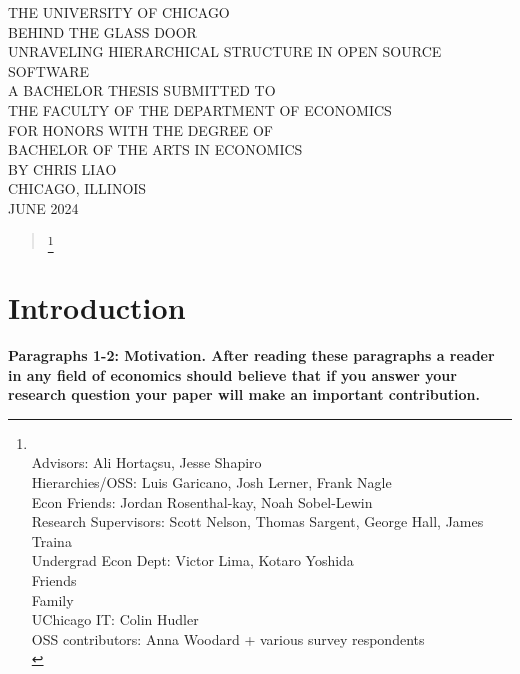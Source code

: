 \documentclass[12pt,notitlepage]{article}
\begin{document}
\begin{titlepage}
\begin{center}
THE UNIVERSITY OF CHICAGO
\\[1.5in]
BEHIND THE GLASS DOOR\\
UNRAVELING HIERARCHICAL STRUCTURE IN OPEN SOURCE SOFTWARE
\\[1in]
A BACHELOR THESIS SUBMITTED TO \\
\bigskip
THE FACULTY OF THE DEPARTMENT OF ECONOMICS \\
\bigskip
FOR HONORS WITH THE DEGREE OF \\
\bigskip
BACHELOR OF THE ARTS IN ECONOMICS
\\[1.5in]
BY CHRIS LIAO
\\[2in]
CHICAGO, ILLINOIS \\
JUNE 2024
\end{center}
\end{titlepage}

\tableofcontents
\newpage

\begin{abstract}
   \footnote{\\
   Advisors: Ali Hortaçsu, Jesse Shapiro\\
   Hierarchies/OSS: Luis Garicano, Josh Lerner, Frank Nagle\\
   Econ Friends: Jordan Rosenthal-kay, Noah Sobel-Lewin\\
   Research Supervisors: Scott Nelson, Thomas Sargent, George Hall, James Traina \\
   Undergrad Econ Dept: Victor Lima, Kotaro Yoshida\\
   Friends \\
   Family \\
   UChicago IT: Colin Hudler \\
   OSS contributors: Anna Woodard + various survey respondents \\
   }
\end{abstract}
\newpage
\section{Introduction}
\textbf{Paragraphs 1-2: Motivation. After reading these paragraphs a reader in any field of economics should believe that if you answer your research question your paper will make an important contribution.}
\end{document}
